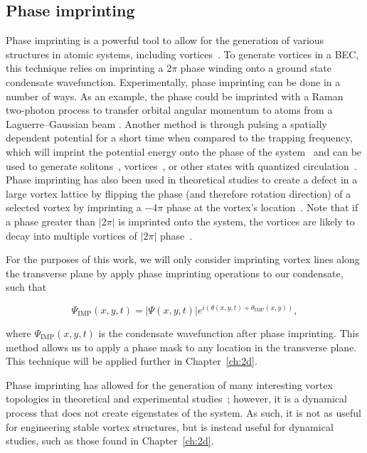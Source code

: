 \subsection{Phase imprinting}

Phase imprinting is a powerful tool to allow for the generation of various structures in atomic systems, including vortices~\cite{kumar2018, moulder2012, burger1999, denschlag2000, wu2002}.
To generate vortices in a BEC, this technique relies on imprinting a $2\pi$ phase winding onto a ground state condensate wavefunction.
Experimentally, phase imprinting can be done in a number of ways.
As an example, the phase could be imprinted with a Raman two-photon process to transfer orbital angular momentum to atoms from a Laguerre--Gaussian beam \cite{moulder2012, ryu2007}.
Another method is through pulsing a spatially dependent potential for a short time when compared to the trapping frequency, which will imprint the potential energy onto the phase of the system~\cite{kasevich1991} and can be used to generate solitons~\cite{denschlag2000}, vortices~\cite{gajda1999}, or other states with quantized circulation~\cite{kumar2018}.
Phase imprinting has also been used in theoretical studies to create a defect in a large vortex lattice by flipping the phase (and therefore rotation direction) of a selected vortex by imprinting a $-4\pi$ phase at the vortex's location~\cite{o2016topo}.
Note that if a phase greater than $|2\pi|$ is imprinted onto the system, the vortices are likely to decay into multiple vortices of $|2\pi|$ phase~\cite{shin2004}.

For the purposes of this work, we will only consider imprinting vortex lines along the transverse plane by apply phase imprinting operations to our condensate, such that

\begin{equation}
\Psi_{\text{IMP}}(x,y,t) = |\Psi(x,y,t)|e^{i(\theta(x,y,t) + \theta_{\text{IMP}}(x,y))},
\end{equation}

\noindent where $\Psi_{\text{IMP}}(x,y,t)$ is the condensate wavefunction after phase imprinting.
This method allows us to apply a phase mask to any location in the transverse plane.
This technique will be applied further in Chapter~\ref{ch:2d}.

Phase imprinting has allowed for the generation of many interesting vortex topologies in theoretical and experimental studies~\cite{white2014, maucher2016}; however, it is a dynamical process that does not create eigenstates of the system.
As such, it is not as useful for engineering stable vortex structures, but is instead useful for dynamical studies, such as those found in Chapter~\ref{ch:2d}.

